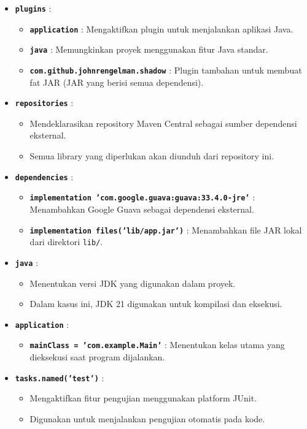 \begin{itemize}
	\item \textbf{\texttt{plugins}} :
	\begin{itemize}
		\item \textbf{\texttt{application}} : Mengaktifkan plugin untuk menjalankan aplikasi Java.
		\item \textbf{\texttt{java}} : Memungkinkan proyek menggunakan fitur Java standar.
		\item \textbf{\texttt{com.github.johnrengelman.shadow}} : Plugin tambahan untuk membuat fat JAR (JAR yang berisi semua dependensi).
	\end{itemize}
	
	\item \textbf{\texttt{repositories}} :
	\begin{itemize}
		\item Mendeklarasikan repository Maven Central sebagai sumber dependensi eksternal.
		\item Semua library yang diperlukan akan diunduh dari repository ini.
	\end{itemize}
	
	\item \textbf{\texttt{dependencies}} :
	\begin{itemize}
		\item \textbf{\texttt{implementation 'com.google.guava:guava:33.4.0-jre'}} : Menambahkan Google Guava sebagai dependensi eksternal.
		\item \textbf{\texttt{implementation files('lib/app.jar')}} : Menambahkan file JAR lokal dari direktori \texttt{lib/}.
	\end{itemize}
	
	\item \textbf{\texttt{java}} :
	\begin{itemize}
		\item Menentukan versi JDK yang digunakan dalam proyek.
		\item Dalam kasus ini, JDK 21 digunakan untuk kompilasi dan eksekusi.
	\end{itemize}
	
	\item \textbf{\texttt{application}} :
	\begin{itemize}
		\item \textbf{\texttt{mainClass = 'com.example.Main'}} : Menentukan kelas utama yang dieksekusi saat program dijalankan.
	\end{itemize}
	
	\item \textbf{\texttt{tasks.named('test')}} :
	\begin{itemize}
		\item Mengaktifkan fitur pengujian menggunakan platform JUnit.
		\item Digunakan untuk menjalankan pengujian otomatis pada kode.
	\end{itemize}
	

\end{itemize}

